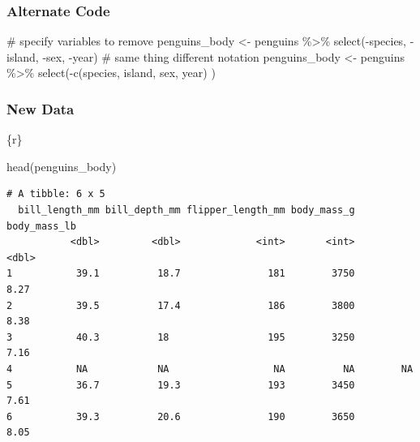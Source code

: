 \documentclass[
  letterpaper,
  DIV=11,
  numbers=noendperiod]{scrreprt}
\newenvironment{Shaded}{\begin{snugshade}}{\end{snugshade}}
\newcommand{\CommentTok}[1]{\textcolor[rgb]{0.37,0.37,0.37}{#1}}
\newcommand{\FunctionTok}[1]{\textcolor[rgb]{0.28,0.35,0.67}{#1}}
\newcommand{\InformationTok}[1]{\textcolor[rgb]{0.37,0.37,0.37}{#1}}
\newcommand{\NormalTok}[1]{\textcolor[rgb]{0.00,0.23,0.31}{#1}}
\newcommand{\OtherTok}[1]{\textcolor[rgb]{0.00,0.23,0.31}{#1}}
\newcommand{\SpecialCharTok}[1]{\textcolor[rgb]{0.37,0.37,0.37}{#1}}
\begin{document}
\hypertarget{alternate-code-1}{%
\subsubsection*{Alternate Code}\label{alternate-code-1}}

\begin{Shaded}
\begin{Highlighting}[]
\CommentTok{\# specify variables to remove}
\NormalTok{penguins\_body }\OtherTok{\textless{}{-}}\NormalTok{ penguins }\SpecialCharTok{\%\textgreater{}\%} 
  \FunctionTok{select}\NormalTok{(}\SpecialCharTok{{-}}\NormalTok{species, }\SpecialCharTok{{-}}\NormalTok{island, }\SpecialCharTok{{-}}\NormalTok{sex, }\SpecialCharTok{{-}}\NormalTok{year)}
\CommentTok{\# same thing different notation}
\NormalTok{penguins\_body }\OtherTok{\textless{}{-}}\NormalTok{ penguins }\SpecialCharTok{\%\textgreater{}\%} 
  \FunctionTok{select}\NormalTok{(}\SpecialCharTok{{-}}\FunctionTok{c}\NormalTok{(species, island, sex, year) )}
\end{Highlighting}
\end{Shaded}

\hypertarget{new-data-2}{%
\subsubsection*{New Data}\label{new-data-2}}

\begin{Shaded}
\begin{Highlighting}[]
\InformationTok{\textasciigrave{}\textasciigrave{}\textasciigrave{}\{r\}}

\FunctionTok{head}\NormalTok{(penguins\_body)}
\InformationTok{\textasciigrave{}\textasciigrave{}\textasciigrave{}}
\end{Highlighting}
\end{Shaded}

\begin{verbatim}
# A tibble: 6 x 5
  bill_length_mm bill_depth_mm flipper_length_mm body_mass_g body_mass_lb
           <dbl>         <dbl>             <int>       <int>        <dbl>
1           39.1          18.7               181        3750         8.27
2           39.5          17.4               186        3800         8.38
3           40.3          18                 195        3250         7.16
4           NA            NA                  NA          NA        NA   
5           36.7          19.3               193        3450         7.61
6           39.3          20.6               190        3650         8.05
\end{verbatim}
\end{document}
